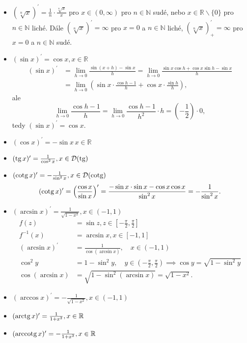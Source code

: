 \begin{itemize}
	\item $\left( \sqrt[n]{x} \right )^\prime = \frac{1}{n} \cdot \frac{\sqrt[n]{x}}{x} $ pro $x \in (0,\infty)$ pro $n \in \mathbb N $ sudé, nebo $x \in \mathbb R \smallsetminus \{0\}$ pro $n \in \mathbb N $ liché.
	Dále $(\sqrt[n]{x})^\prime = \infty$ pro $x=0$ a $n \in \mathbb N $ liché,
	$(\sqrt[n]{x})_+^\prime = \infty$ pro $x=0$ a $n\in \mathbb N $ sudé.
	\item $(\sin x )^\prime = \cos x, x \in \mathbb R $
	\begin{align*}
	(\sin x )^\prime &=\lim_{h\to 0} \frac{\sin(x+h)-\sin x}{h} = \lim_{h\to 0} \frac{\sin x \cos h + \cos x \sin h-\sin x}{h} \\
	&= \lim_{h\to 0} \left( \sin x \cdot \frac{\cos h - 1}{h} + \cos x \cdot \frac{\sin h }{h} \right ),
	\end{align*}
	ale
	$$
 \lim_{h\to 0} \frac{\cos h -1}{h} = \lim_{h\to 0} \frac{\cos h-1}{h^2}\cdot h = \left( -\frac{1}{2} \right )\cdot 0,
	$$
	tedy $(\sin x )^\prime = \cos x.$
	\item $(\cos x)^\prime = -\sin x \, x \in \mathbb R $
	\item $(\operatorname{tg} x)^\prime = \frac{1}{\cos^2 x}, x \in \mathcal D(\operatorname{tg})$
	\item $(\operatorname{cotg} x )^\prime = -\frac{1}{\sin^2 x}, x \in \mathcal D(\operatorname{cotg})$
	$$
	    (\operatorname{cotg} x) ^\prime = \left( \frac{\cos x}{\sin x} \right )^\prime = \frac{-\sin x \cdot \sin x - \cos x \cos x}{\sin^2 x} = - \frac{1}{\sin^2 x}.
	$$
	\item $(\arcsin x)^\prime = \frac{1}{\sqrt{1-x^2}}, x \in (-1,1)$
	\begin{align*}
		f(z) &= \sin z, z \in \left [ -\frac{\pi}{2}, \frac{\pi}{2} \right ]  \\
		f^{-1}(x) &= \arcsin x, x \in \left [ -1,1 \right ] \\
		(\arcsin x)^\prime &= \frac{1}{\cos(\arcsin x)}, \quad x \in (-1,1)\\
		\cos^2 y &= 1-\sin^2 y, \quad y \in \left( -\frac{\pi}{2}, \frac{\pi}{2} \right ) \implies \cos y = \sqrt{1-\sin ^2y} \\
		\cos(\arcsin x) &= \sqrt{1-\sin^2(\arcsin x)}=\sqrt{1-x^2}.
	\end{align*}
	\item $(\arccos x)^\prime = -\frac{1}{\sqrt{1-x^2}}, x \in (-1,1)$
	\item $(\operatorname{arctg} x)^\prime = \frac{1}{1+x^2},x \in \mathbb R $
	\item $(\operatorname{arccotg} x)^\prime = -\frac{1}{1+x^2}, x \in \mathbb R $
\end{itemize}

